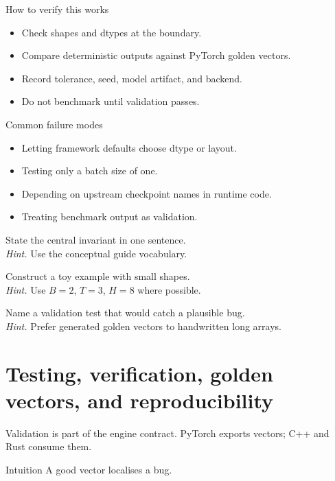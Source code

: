 \begin{verificationbox}{How to verify this works}
\begin{itemize}
\item Check shapes and dtypes at the boundary.
\item Compare deterministic outputs against PyTorch golden vectors.
\item Record tolerance, seed, model artifact, and backend.
\item Do not benchmark until validation passes.
\end{itemize}
\end{verificationbox}

\begin{warningbox}{Common failure modes}
\begin{itemize}
\item Letting framework defaults choose dtype or layout.
\item Testing only a batch size of one.
\item Depending on upstream checkpoint names in runtime code.
\item Treating benchmark output as validation.
\end{itemize}
\end{warningbox}

\begin{chapterexercises}
\item State the central invariant in one sentence.\\
\textit{Hint.} Use the conceptual guide vocabulary.
\item Construct a toy example with small shapes.\\
\textit{Hint.} Use $B=2$, $T=3$, $H=8$ where possible.
\item Name a validation test that would catch a plausible bug.\\
\textit{Hint.} Prefer generated golden vectors to handwritten long arrays.
\end{chapterexercises}

\chapter{Testing, verification, golden vectors, and reproducibility}
\label{ch:testing}
Validation is part of the engine contract. PyTorch exports vectors; C++ and Rust consume them.



\begin{intuitionbox}{Intuition}
A good vector localises a bug.
\end{intuitionbox}

